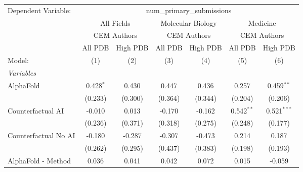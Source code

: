 \begingroup
\centering
\begin{tabular}{lcccccc}
   \tabularnewline \midrule \midrule
   Dependent Variable: & \multicolumn{6}{c}{num\_primary\_submissions}\\
 & \multicolumn{2}{c}{All Fields} & \multicolumn{2}{c}{Molecular Biology} & \multicolumn{2}{c}{Medicine} \\
\cmidrule(lr){2-3} \cmidrule(lr){4-5} \cmidrule(lr){6-7}
 & \multicolumn{2}{c}{CEM Authors} & \multicolumn{2}{c}{CEM Authors} & \multicolumn{2}{c}{CEM Authors} \\
\cmidrule(lr){2-3} \cmidrule(lr){4-5} \cmidrule(lr){6-7}
 & \multicolumn{1}{c}{All PDB} & \multicolumn{1}{c}{High PDB} & \multicolumn{1}{c}{All PDB} & \multicolumn{1}{c}{High PDB} & \multicolumn{1}{c}{All PDB} & \multicolumn{1}{c}{High PDB} \\
\cmidrule(lr){2-2} \cmidrule(lr){3-3} \cmidrule(lr){4-4} \cmidrule(lr){5-5} \cmidrule(lr){6-6} \cmidrule(lr){7-7}
   Model:                                                     & (1)            & (2)          & (3)          & (4)            & (5)           & (6)\\  
   \midrule
   \emph{Variables}\\
   AlphaFold                                                  & 0.428$^{*}$    & 0.430        & 0.447        & 0.436          & 0.257         & 0.459$^{**}$\\   
                                                              & (0.233)        & (0.300)      & (0.364)      & (0.344)        & (0.204)       & (0.206)\\   
   Counterfactual AI                                          & -0.010         & 0.013        & -0.170       & -0.162         & 0.542$^{**}$  & 0.521$^{***}$\\   
                                                              & (0.236)        & (0.371)      & (0.318)      & (0.275)        & (0.248)       & (0.177)\\   
   Counterfactual No AI                                       & -0.180         & -0.287       & -0.307       & -0.473         & 0.214         & 0.187\\   
                                                              & (0.262)        & (0.295)      & (0.437)      & (0.383)        & (0.198)       & (0.193)\\   
   AlphaFold - Method                                         & 0.036          & 0.041        & 0.042        & 0.072          & 0.015         & -0.059\\   

\end{tabular}
